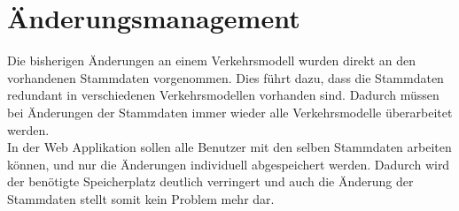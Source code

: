 \section{Änderungsmanagement}
Die bisherigen Änderungen an einem Verkehrsmodell wurden direkt an den vorhandenen Stammdaten vorgenommen. Dies führt dazu, dass die Stammdaten redundant in verschiedenen Verkehrsmodellen vorhanden sind. Dadurch müssen bei Änderungen der Stammdaten immer wieder alle Verkehrsmodelle überarbeitet werden.\\
In der Web Applikation sollen alle Benutzer mit den selben Stammdaten arbeiten können, und nur die Änderungen individuell abgespeichert werden. Dadurch wird der benötigte Speicherplatz deutlich verringert und auch die Änderung der Stammdaten stellt somit kein Problem mehr dar.\\